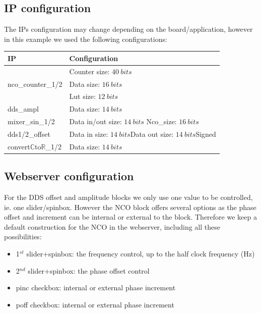 \documentclass[12pt,oneside]{article}
\begin{document}
\newpage
\subsection{IP configuration}
\vspace{0.5cm}
The IPs configuration may change depending on the board/application, however in this example we used the following configurations:
\begin{center}
	\begin{tabular}{|>{\centering\arraybackslash}m{.3\linewidth} | >{\centering\arraybackslash}m{.3\linewidth} |}
\hline
IP & Configuration \\
\hline
 & Counter size: $40~bits$\\ nco\_counter\_1/2 &Data size: $16~bits$\\ &Lut size: $12~bits$ \\
\hline
dds\_ampl&Data size: $14~bits$ \\
\hline
mixer\_sin\_1/2&Data in/out size: $14~bits$ \newline Nco\_size: $16~bits$ \\
\hline
dds1/2\_offset&Data in size: $14~bits$\newline Data out size: $14~bits$\newline Signed \\
\hline
convert$\mathbb{C}$to$\mathbb{R}$\_1/2&Data size: $14~bits$\\
\hline
\end{tabular}
\end{center}
\vspace{0.1cm}
\subsection{Webserver configuration}\label{subsec:doubleDDSws}

For the DDS offset and amplitude blocks we only use one value to be controlled, ie. one slider/spinbox. However the NCO block offers several options as the phase offset and increment can be internal or external to the block. Therefore we keep a default construction for the NCO in the webserver, including all these possibilities: 
\begin{itemize}
	\setlength\itemsep{-0.1cm}
	\item 1$^{st}$ slider+spinbox: the frequency control, up to the half clock frequency (Hz)
	\item 2$^{nd}$ slider+spinbox: the phase offset control
	\item pinc checkbox: internal or external phase increment
	\item poff checkbox: internal or external phase increment
\end{itemize} 
\end{document}
